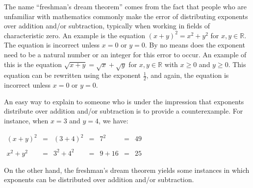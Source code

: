 \documentclass[12pt]{article}
\begin{document}
The name ``freshman's dream theorem'' comes from the fact that people who are unfamiliar with mathematics commonly make the error of distributing exponents over addition and/or subtraction, typically when working in fields of characteristic zero.  An example is the equation $(x+y)^2=x^2+y^2$ for $x,y \in \mathbb{R}$.  The equation is incorrect unless $x=0$ or $y=0$.  By no means does the exponent need to be a natural number or an integer for this error to occur.  An example of this is the equation $\sqrt{x+y}=\sqrt{x}+\sqrt{y}$ for $x,y \in \mathbb{R}$ with $x \ge 0$ and $y \ge 0$.  This equation can be rewritten using the exponent $\frac{1}{2}$, and again, the equation is incorrect unless $x=0$ or $y=0$.

An easy way to explain to someone who is under the impression that exponents distribute over addition and/or subtraction is to provide a  counterexample.  For instance, when $x=3$ and $y=4$, we have:

\begin{center}
$\begin{array}{ccccccc}
(x+y)^2 &=& (3+4)^2 &=& 7^2 &=& 49 \\
\\
x^2+y^2 &=& 3^2+4^2 &=& 9+16 &=& 25 \end{array}$
\end{center}

On the other hand, the freshman's dream theorem yields some instances in which exponents can be distributed over addition and/or subtraction.
\end{document}
